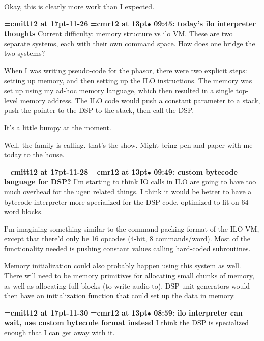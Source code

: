 Okay, this is clearly more work than I expected.
\par

{\medskip\noindent\bf\font\titlefont=cmitt12 at 17pt-11-26}\medskip
{\smallskip\noindent\bf\font\titlefont=cmr12 at 13pt\titlefont $\bullet$ 09:45: today's ilo interpreter thoughts}\smallskip
Current difficulty: memory structure vs ilo VM. These are two separate systems, each with their own command space. How does one bridge the two systems?
\par

When I was writing pseudo-code for the phasor, there were two explicit steps: setting up memory, and then setting up the ILO instructions. The memory was set up using my ad-hoc memory language, which then resulted in a single top-level memory address. The ILO code would push a constant parameter to a stack, push the pointer to the DSP to the stack, then call the DSP.
\par

It's a little bumpy at the moment.
\par

Well, the family is calling. that's the show. Might bring pen and paper with me today to the house.
\par

{\medskip\noindent\bf\font\titlefont=cmitt12 at 17pt-11-28}\medskip
{\smallskip\noindent\bf\font\titlefont=cmr12 at 13pt\titlefont $\bullet$ 09:49: custom bytecode language for DSP?}\smallskip
I'm starting to think IO calls in ILO are going to have too much overhead for the ugen related things. I think it would be better to have a bytecode interpreter more specialized for the DSP code, optimized to fit on 64-word blocks.
\par

I'm imagining something similar to the command-packing format of the ILO VM, except that there'd only be 16 opcodes (4-bit, 8 commands/word). Most of the functionality needed is pushing constant values calling hard-coded subroutines.
\par

Memory initialization could also probably happen using this system as well. There will need to be memory primitives for allocating small chunks of memory, as well as allocating full blocks (to write audio to). DSP unit generators would then have an initialization function that could set up the data in memory.
\par

{\medskip\noindent\bf\font\titlefont=cmitt12 at 17pt-11-30}\medskip
{\smallskip\noindent\bf\font\titlefont=cmr12 at 13pt\titlefont $\bullet$ 08:59: ilo interpreter can wait, use custom bytecode format instead}\smallskip
I think the DSP is specialized enough that I can get away with it.
\par

